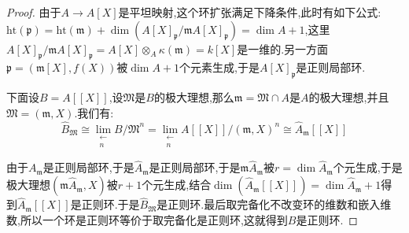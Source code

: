 \begin{enumerate}
\begin{proof}
    	\qquad
    	
    	由于$A\to A[X]$是平坦映射,这个环扩张满足下降条件,此时有如下公式:$\mathrm{ht}(\mathfrak{p})=\mathrm{ht}(\mathfrak{m})+\dim(A[X]_{\mathfrak{p}}/\mathfrak{m}A[X]_{\mathfrak{p}})=\dim A+1$,这里$A[X]_{\mathfrak{p}}/\mathfrak{m}A[X]_{\mathfrak{p}}=A[X]\otimes_A\kappa(\mathfrak{m})=k[X]$是一维的.另一方面$\mathfrak{p}=(\mathfrak{m}[X],f(X))$被$\dim A+1$个元素生成,于是$A[X]_{\mathfrak{p}}$是正则局部环.
    	
    	\qquad
    	
    	下面设$B=A[[X]]$,设$\mathfrak{M}$是$B$的极大理想,那么$\mathfrak{m}=\mathfrak{M}\cap A$是$A$的极大理想,并且$\mathfrak{M}=(\mathfrak{m},X)$.我们有:
    	$$\widehat{B}_{\mathfrak{M}}\cong\lim\limits_{\substack{\leftarrow\\n}}B/\mathfrak{M}^n=\lim\limits_{\substack{\leftarrow\\n}}A[[X]]/(\mathfrak{m},X)^n\cong\widehat{A}_{\mathfrak{m}}[[X]]$$
    	
    	由于$A_{\mathfrak{m}}$是正则局部环,于是$\widehat{A}_{\mathfrak{m}}$是正则局部环,于是$\mathfrak{m}\widehat{A}_{\mathfrak{m}}$被$r=\dim\widehat{A}_{\mathfrak{m}}$个元生成,于是极大理想$(\mathfrak{m}\widehat{A}_{\mathfrak{m}},X)$被$r+1$个元生成,结合$\dim(\widehat{A}_{\mathfrak{m}}[[X]])=\dim\widehat{A}_{\mathfrak{m}}+1$得到$\widehat{A}_{\mathfrak{m}}[[X]]$是正则环.于是$\widehat{B}_{\mathfrak{M}}$是正则环.最后取完备化不改变环的维数和嵌入维数,所以一个环是正则环等价于取完备化是正则环,这就得到$B$是正则环.
    \end{proof}
\end{enumerate}


